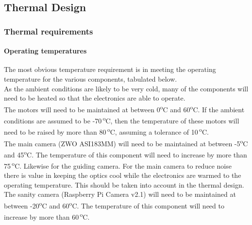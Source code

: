 \pagebreak
\subsection{Thermal Design} 
\label{Thermal_section}















\subsubsection{Thermal requirements}

\paragraph{Operating temperatures}

The most obvious temperature requirement is in meeting the operating temperature for the various components, tabulated below.\\ 



As the ambient conditions are likely to be very cold, many of the components will need to be heated so that the electronics are able to operate.\\

The motors will need to be maintained at between 0\textsuperscript{o}C and 60\textsuperscript{o}C. If the ambient conditions are assumed to be -70\,\textsuperscript{o}C, then the temperature of these motors will need to be raised by more than 80\,\textsuperscript{o}C, assuming a tolerance of 10\,\textsuperscript{o}C.\\

The main camera (ZWO ASI183MM) will need to be maintained at between -5\textsuperscript{o}C and 45\textsuperscript{o}C. The temperature of this component will need to increase by more than 75\,\textsuperscript{o}C. Likewise for the guiding camera. For the main camera to reduce noise there is value in keeping the optics cool while the electronics are warmed to the operating temperature. This should be taken into account in the thermal design.\\

The sanity camera (Raspberry Pi Camera v2.1) will need to be maintained at between -20\textsuperscript{o}C and 60\textsuperscript{o}C. The temperature of this component will need to increase by more than 60\,\textsuperscript{o}C.\\

